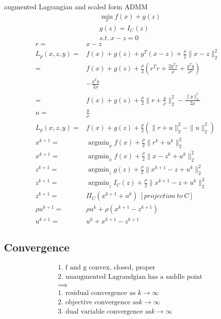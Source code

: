 \message{ !name(notebook.tex)}\documentclass[8pt]{report}
\DeclareMathOperator*{\argmin}{argmin}
\newcommand{\norm}[1]{\|#1\|}
\begin{document}
\begin{multicols*}{2}
  augmented Lagrangian and scaled form ADMM
  \begin{align*}
    &\min_x f(x) + g(z)\\
    &g(z) = I_C(z)\\
    &s.t.\ x-z=0
  \end{align*}
  \begin{align*}
    r=&x-z\\
    L_p(x,z,y) =& f(x) + g(z) + y^T(x-z) + \frac{\rho}{2} \norm{x-z}_2^2\\
               =& f(x) + g(z) + \frac{\rho}{2}(r^T r + \frac{2 y^T r}{\rho} + \frac{y^T y}{\rho^2})\\
                & - \frac{y^T y}{2 \rho}\\
    =& f(x) + g(z) + \frac{\rho}{2} \norm{r+\frac{y}{\rho}}_2^2 - \frac{\norm{y}_2^2}{2\rho}\\
    u=& \frac{y}{\rho}\\
    L_p(x,z,y) =& f(x) + g(z) + \frac{\rho}{2}(\norm{r+u}_2^2 - \norm{u}_2^2)\\
    x^{k+1} =& \argmin_x f(x) + \frac{\rho}{2} \norm{r^k+u^k}_2^2\\
    x^{k+1} =& \argmin_x f(x) + \frac{\rho}{2} \norm{x-z^k+u^k}_2^2\\
    z^{k+1} =& \argmin_z g(z) + \frac{\rho}{2} \norm{x^{k+1}-z+u^k}_2^2\\
    z^{k+1} =& \argmin_z I_C(z) + \frac{\rho}{2} \norm{x^{k+1}-z+u^k}_2^2\\
    z^{k+1} =& \Pi_C(x^{k+1}+u^k)\ [projection\ to\ C]\\
    \rho u^{k+1} =& \rho u^k + \rho (x^{k+1} - z^{k+1})\\
    u^{k+1} =& u^k + x^{k+1} - z^{k+1}
  \end{align*}

  \vfill\null
  \columnbreak
  
  \subsection{Convergence}
  \begin{align*}
    &\text{1. f and g convex, closed, proper}\\
    &\text{2. unaugmented Lagrandgian has a saddle point}\\
    &\implies\\
    &\text{1. residual convergence as }k \rightarrow \infty\\
    &\text{2. objective convergence as}k \rightarrow \infty\\
    &\text{3. dual variable convergence as}k \rightarrow \infty
  \end{align*}
  

\end{multicols*}
\end{document}
